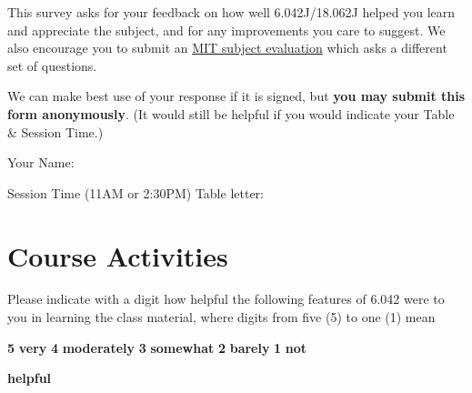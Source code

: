 \documentclass[handout]{mcs}
\begin{document}

This survey asks for your feedback on how well 6.042J/18.062J helped
you learn and appreciate the subject, and \iffalse .  Comparing
student self-assessments given in this survey to student grades helps
us determine how to improve the course.  We would also be grateful\fi
for any improvements you care to suggest.  We also encourage you to
submit an
\href{http://web.mit.edu/subjectevaluation/evaluate.html}{MIT subject
  evaluation} which asks a different set of questions.

We can make best use of your response if it is signed, but \textbf{you
  may submit this form anonymously}.  (It would still be helpful if
you would indicate your Table \& Session Time.)

\large{Your Name:} \brule{3in}

Session Time (11AM or 2:30PM)\brule{0.5in}    Table letter: \brule{0.5in}


\section*{Course Activities}

Please indicate with a digit how helpful the following features of
6.042 were to you in learning the class material, where digits from
five (5) to one (1) mean
\begin{center}
\textbf{5}  \textbf{very} \qquad
\textbf{4}  \textbf{moderately}\qquad
\textbf{3} \textbf{somewhat}\qquad
\textbf{2} \textbf{barely}\qquad
\textbf{1} \textbf{not}

  \textbf{helpful}
\end{center}

\iffalse
 How helpful have the following aspects of the course been in
achieving the subject outcomes for you personally:
\fi
\end{document}
